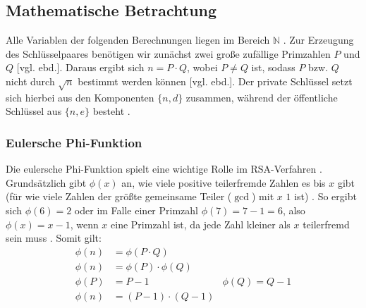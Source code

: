 \documentclass[a4paper,ngerman, headheight=28pt,12pt]{scrartcl}
\newcommand{\vcite}[1]{\cite[vgl.][]{#1}}
\newcommand{\vebd}{[vgl. ebd.]}
\begin{document}
\subsection{Mathematische Betrachtung}
Alle Variablen der folgenden Berechnungen liegen im Bereich $\mathbb{N}$ \vcite{RsaGenCond}. Zur Erzeugung des Schlüsselpaares benötigen wir zunächst zwei große zufällige Primzahlen $P$ und $Q$ \vebd. Daraus ergibt sich $n = P \cdot Q$, wobei $P \neq Q$ ist, sodass $P$ bzw. $Q$ nicht durch $\sqrt{n}$ bestimmt werden können \vebd. Der private Schlüssel setzt sich hierbei aus den Komponenten $\{ n, d \}$ zusammen, während der öffentliche Schlüssel aus $\{ n, e \}$ besteht \vcite{RsaVariables}.
\subsubsection{Eulersche Phi-Funktion}
Die eulersche Phi-Funktion spielt eine wichtige Rolle im RSA-Verfahren \vcite{TotientFuncMultiplicative}. Grundsätzlich gibt $\phi(x)$ an, wie viele positive teilerfremde Zahlen es bis $x$ gibt (für wie viele Zahlen der größte gemeinsame Teiler ($\gcd$) mit $x$ $1$ ist) \vcite{EulersTotientFunction}. So ergibt sich $\phi(6) = 2$ oder im Falle einer Primzahl $\phi(7) = 7 - 1 = 6$, also $\phi(x) = x-1$, wenn $x$ eine Primzahl ist, da jede Zahl kleiner als $x$ teilerfremd sein muss \vcite{TotientFuncMultiplicative}. Somit gilt:
\begin{equation*}
  \begin{aligned}
    \phi(n) & = \phi(P \cdot Q)                                                \\
    \phi(n) & = \phi(P) \cdot \phi(Q)                                          \\
    \phi(P) & = P -1                                          & \phi(Q) = Q -1 \\
    \phi(n) & = \left(P - 1 \right) \cdot \left( Q - 1\right)
  \end{aligned}
\end{equation*}
\end{document}
